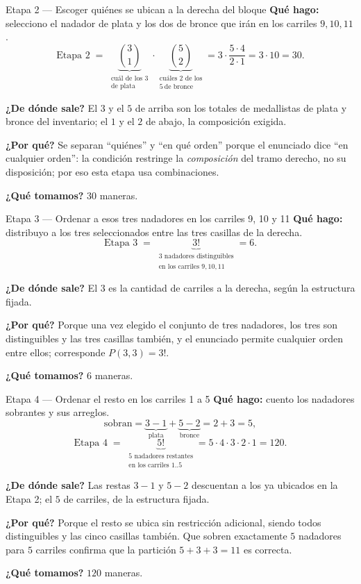 \documentclass[11pt]{article}
\begin{document}
\begin{paso}{Etapa 2 --- Escoger qui\'enes se ubican a la derecha del bloque}
\textbf{Qu\'e hago:} selecciono el nadador de plata y los dos de bronce que ir\'an en los carriles $9,10,11$.
\[
\text{Etapa 2}\;=\;\underbrace{\binom{3}{1}}_{\substack{\text{cu\'al de los 3}\\ \text{de plata}}}
\cdot\underbrace{\binom{5}{2}}_{\substack{\text{cu\'ales 2 de los}\\ 5\ \text{de bronce}}}
=3\cdot\frac{5\cdot 4}{2\cdot 1}=3\cdot 10=30 .
\]

\textbf{¿De d\'onde sale?} El $3$ y el $5$ de arriba son los totales de medallistas de plata y bronce del
inventario; el $1$ y el $2$ de abajo, la composici\'on exigida.

\textbf{¿Por qu\'e?} Se separan ``qui\'enes'' y ``en qu\'e orden'' porque el enunciado dice ``en cualquier
orden'': la condici\'on restringe la \emph{composici\'on} del tramo derecho, no su disposici\'on; por eso
esta etapa usa combinaciones.

\textbf{¿Qu\'e tomamos?} $30$ maneras.
\end{paso}

\begin{paso}{Etapa 3 --- Ordenar a esos tres nadadores en los carriles 9, 10 y 11}
\textbf{Qu\'e hago:} distribuyo a los tres seleccionados entre las tres casillas de la derecha.
\[
\text{Etapa 3}\;=\;\underbrace{3!}_{\substack{\text{3 nadadores distinguibles}\\ \text{en los carriles }9,10,11}}=6 .
\]

\textbf{¿De d\'onde sale?} El $3$ es la cantidad de carriles a la derecha, seg\'un la estructura fijada.

\textbf{¿Por qu\'e?} Porque una vez elegido el conjunto de tres nadadores, los tres son distinguibles y las
tres casillas tambi\'en, y el enunciado permite cualquier orden entre ellos; corresponde $P(3,3)=3!$.

\textbf{¿Qu\'e tomamos?} $6$ maneras.
\end{paso}

\begin{paso}{Etapa 4 --- Ordenar el resto en los carriles 1 a 5}
\textbf{Qu\'e hago:} cuento los nadadores sobrantes y sus arreglos.
\[
\text{sobran}=\underbrace{3-1}_{\text{plata}}+\underbrace{5-2}_{\text{bronce}}=2+3=5 ,
\]
\[
\text{Etapa 4}\;=\;\underbrace{5!}_{\substack{\text{5 nadadores restantes}\\ \text{en los carriles }1..5}}=5\cdot4\cdot3\cdot2\cdot1=120 .
\]

\textbf{¿De d\'onde sale?} Las restas $3-1$ y $5-2$ descuentan a los ya ubicados en la Etapa 2; el $5$ de
carriles, de la estructura fijada.

\textbf{¿Por qu\'e?} Porque el resto se ubica sin restricci\'on adicional, siendo todos distinguibles y las
cinco casillas tambi\'en. Que sobren exactamente $5$ nadadores para $5$ carriles confirma que la partici\'on
$5+3+3=11$ es correcta.

\textbf{¿Qu\'e tomamos?} $120$ maneras.
\end{paso}
\end{document}
